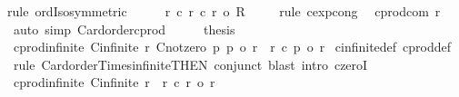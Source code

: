 \begin{isabellebody}
{\isacharparenleft}{\kern0pt}rule\ ordIso{\isacharunderscore}{\kern0pt}symmetric{\isacharparenright}{\kern0pt}\isanewline
\ \ \isamarkupfalse%
\ \isamarkupfalse%
\ {\isachardoublequoteopen}r{}\ {\isacharcircum}{\kern0pt}c\ {\isacharparenleft}{\kern0pt}r{}\ {\isacharasterisk}{\kern0pt}c\ r{}{\isacharparenright}{\kern0pt}\ {\isacharequal}{\kern0pt}o\ {\isacharquery}{\kern0pt}R{\isachardoublequoteclose}\isanewline
\ \ \ \ \isamarkupfalse%
{\isacharparenleft}{\kern0pt}rule\ cexp{\isacharunderscore}{\kern0pt}cong{}{\isacharparenright}{\kern0pt}\ \isamarkupfalse%
\ cprod{\isacharunderscore}{\kern0pt}com\ r{}\ \isamarkupfalse%
\ {\isacharparenleft}{\kern0pt}auto\ simp{\isacharcolon}{\kern0pt}\ Card{\isacharunderscore}{\kern0pt}order{\isacharunderscore}{\kern0pt}cprod{\isacharparenright}{\kern0pt}\isanewline
\ \ \isamarkupfalse%
\ \isamarkupfalse%
\ {\isacharquery}{\kern0pt}thesis\ \isacommand{{\isachardot}{\kern0pt}}\isamarkupfalse%
\isanewline
{}\isamarkupfalse%
%
\endisatagproof
{\isafoldproof}%
%
\isadelimproof
\isanewline
%
\endisadelimproof
\isanewline
{}\isamarkupfalse%
\ cprod{\isacharunderscore}{\kern0pt}infinite{}{\isacharprime}{\kern0pt}{\isacharcolon}{\kern0pt}\ {\isachardoublequoteopen}{\isasymlbrakk}Cinfinite\ r{\isacharsemicolon}{\kern0pt}\ Cnotzero\ p{\isacharsemicolon}{\kern0pt}\ p\ {\isasymle}o\ r{\isasymrbrakk}\ {\isasymLongrightarrow}\ r\ {\isacharasterisk}{\kern0pt}c\ p\ {\isacharequal}{\kern0pt}o\ r{\isachardoublequoteclose}\isanewline
%
\isadelimproof
%
\endisadelimproof
%
\isatagproof
{}\isamarkupfalse%
\ cinfinite{\isacharunderscore}{\kern0pt}def\ cprod{\isacharunderscore}{\kern0pt}def\isanewline
{}\isamarkupfalse%
\ {\isacharparenleft}{\kern0pt}rule\ Card{\isacharunderscore}{\kern0pt}order{\isacharunderscore}{\kern0pt}Times{\isacharunderscore}{\kern0pt}infinite{\isacharbrackleft}{\kern0pt}THEN\ conjunct{}{\isacharbrackright}{\kern0pt}{\isacharparenright}{\kern0pt}\ {\isacharparenleft}{\kern0pt}blast\ intro{\isacharcolon}{\kern0pt}\ czeroI{\isacharparenright}{\kern0pt}{\isacharplus}{\kern0pt}%
\endisatagproof
{\isafoldproof}%
%
\isadelimproof
\isanewline
%
\endisadelimproof
\isanewline
{}\isamarkupfalse%
\ cprod{\isacharunderscore}{\kern0pt}infinite{\isacharcolon}{\kern0pt}\ {\isachardoublequoteopen}Cinfinite\ r\ {\isasymLongrightarrow}\ r\ {\isacharasterisk}{\kern0pt}c\ r\ {\isacharequal}{\kern0pt}o\ r{\isachardoublequoteclose}\isanewline

\end{isabellebody}
